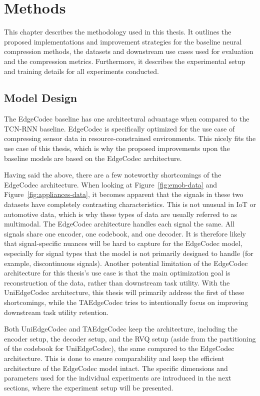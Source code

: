 
\chapter{Methods}
\label{chap:methods}

This chapter describes the methodology used in this thesis. It outlines the proposed implementations and improvement strategies for the baseline neural compression methods, the datasets and downstream use cases used for evaluation and the compression metrics. Furthermore, it describes the experimental setup and training details for all experiments conducted. 

\section{Model Design}

The EdgeCodec baseline has one architectural advantage when compared to the TCN-RNN baseline. EdgeCodec is specifically optimized for the use case of compressing sensor data in resource-constrained environments. This nicely fits the use case of this thesis, which is why the proposed improvements upon the baseline models are based on the EdgeCodec architecture. 

Having said the above, there are a few noteworthy shortcomings of the EdgeCodec architecture. When looking at Figure~\ref{fig:emob-data} and Figure~\ref{fig:appliances-data}, it becomes apparent that the signals in these two datasets have completely contrasting characteristics. This is not unusual in IoT or automotive data, which is why these types of data are usually referred to as multimodal. The EdgeCodec architecture handles each signal the same. All signals share one encoder, one codebook, and one decoder. It is therefore likely that signal-specific nuances will be hard to capture for the EdgeCodec model, especially for signal types that the model is not primarily designed to handle (for example, discontinuous signals). Another potential limitation of the EdgeCodec architecture for this thesis's use case is that the main optimization goal is reconstruction of the data, rather than downstream task utility. With the UniEdgeCodec architecture, this thesis will primarily address the first of these shortcomings, while the TAEdgeCodec tries to intentionally focus on improving downstream task utility retention. 

Both UniEdgeCodec and TAEdgeCodec keep the architecture, including the encoder setup, the decoder setup, and the RVQ setup (aside from the partitioning of the codebook for UniEdgeCodec), the same compared to the EdgeCodec architecture. This is done to ensure comparability and keep the efficient architecture of the EdgeCodec model intact. The specific dimensions and parameters used for the individual experiments are introduced in the next sections, where the experiment setup will be presented. 

